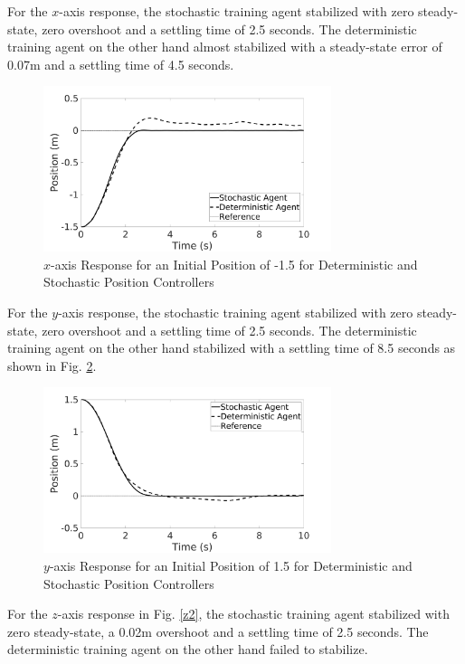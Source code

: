     For the $x$-axis response, the stochastic training agent stabilized with zero steady-state, zero overshoot and a settling time of 2.5 seconds. The deterministic training agent on the other hand almost stabilized with a steady-state error of 0.07m and a settling time of 4.5 seconds.
    \begin{figure}[H]
            \centering
            \includegraphics[width=0.75\textwidth]{plots/x2.jpg}
            \caption{$x$-axis Response for an Initial Position of -1.5 for Deterministic and Stochastic Position Controllers}
            \label{X2}
    \end{figure}\clearpage
    For the $y$-axis response, the stochastic training agent stabilized with zero steady-state, zero overshoot and a settling time of 2.5 seconds. The deterministic training agent on the other hand stabilized with a settling time of 8.5 seconds as shown in Fig. \ref{y2}.
    \begin{figure}[H]
            \centering
            \includegraphics[width=0.75\textwidth]{plots/y2.jpg}
            \caption{$y$-axis Response for an Initial Position of 1.5 for Deterministic and Stochastic Position Controllers}
            \label{y2}
    \end{figure}
    For the $z$-axis response in Fig. \ref{z2}, the stochastic training agent stabilized with zero steady-state, a 0.02m overshoot and a settling time of 2.5 seconds. The deterministic training agent on the other hand failed to stabilize.
